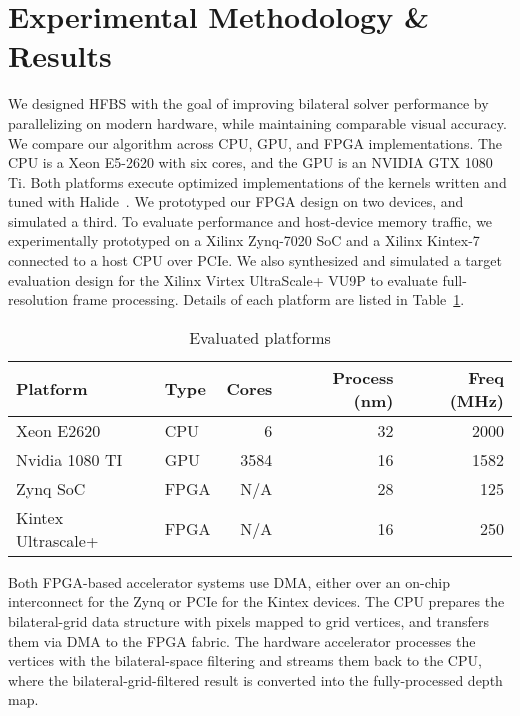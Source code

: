 
\section{Experimental Methodology \& Results}
We designed HFBS with the goal of improving bilateral solver performance by parallelizing on modern hardware, while maintaining comparable visual accuracy.
We compare our algorithm across CPU, GPU, and FPGA implementations.
The CPU is a Xeon E5-2620 with six cores, and the GPU is an NVIDIA GTX 1080 Ti.
Both platforms execute optimized implementations of the kernels written and tuned with Halide~\cite{halide}.
We prototyped our FPGA design on two devices, and simulated a third.
To evaluate performance and host-device memory traffic, we experimentally prototyped on a Xilinx Zynq-7020 SoC and  a Xilinx Kintex-7 connected to a host CPU over PCIe.
We also synthesized and simulated a target evaluation design for the Xilinx Virtex UltraScale+ VU9P to evaluate full-resolution frame processing.
Details of each platform are listed in Table~\ref{evaluated-platforms}.

\begin{table}[h]
\centering
\caption{Evaluated platforms}
\begin{tabular}{@{}llrrr@{}}
\toprule
Platform & Type & Cores & Process (nm) & Freq (MHz) \\ \midrule
Xeon E2620 & CPU & 6 & 32 & 2000 \\
Nvidia 1080 TI & GPU & 3584 & 16 & 1582 \\
Zynq SoC & FPGA & N/A & 28 & 125 \\
Kintex Ultrascale+ & FPGA & N/A & 16 & 250 \\
\bottomrule
\end{tabular}
\label{evaluated-platforms}
\end{table}

Both FPGA-based accelerator systems use DMA, either over an on-chip interconnect for the Zynq or PCIe for the Kintex devices.
The CPU prepares the bilateral-grid data structure with pixels mapped to grid vertices, and transfers them via DMA to the FPGA fabric.
The hardware accelerator processes the vertices with the bilateral-space filtering and streams them back to the CPU, where the bilateral-grid-filtered result is converted into the fully-processed depth map.

